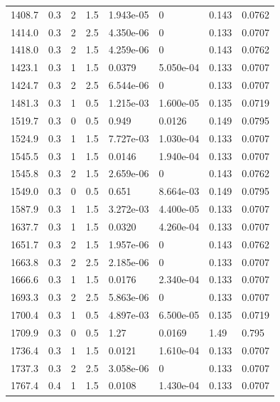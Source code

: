 \documentclass[preview]{standalone}
\begin{document}
{{{\begin{tabular}{L{1.2cm}C{1.2cm} C{0.3cm}C{0.5cm} C{1.4cm}C{1.4cm} C{1.4cm}C{1.4cm}}
  1408.7  &   0.3  & 2     & 1.5 &  1.943e-05  & 0  & 0.143 &  0.0762   \\ 
  1414.0  &   0.3  & 2     & 2.5 &  4.350e-06  & 0  & 0.133 &  0.0707   \\ 
  1418.0  &   0.3  & 2     & 1.5 &  4.259e-06  & 0  & 0.143 &  0.0762   \\ 
  1423.1  &   0.3  & 1     & 1.5 &  0.0379  & 5.050e-04  & 0.133 &  0.0707   \\ 
  1424.7  &   0.3  & 2     & 2.5 &  6.544e-06  & 0  & 0.133 &  0.0707   \\ 
  1481.3  &   0.3  & 1     & 0.5 &  1.215e-03  & 1.600e-05  & 0.135 &  0.0719   \\ 
  1519.7  &   0.3  & 0     & 0.5 &  0.949  & 0.0126  & 0.149 &  0.0795   \\ 
  1524.9  &   0.3  & 1     & 1.5 &  7.727e-03  & 1.030e-04  & 0.133 &  0.0707   \\ 
  1545.5  &   0.3  & 1     & 1.5 &  0.0146  & 1.940e-04  & 0.133 &  0.0707   \\ 
  1545.8  &   0.3  & 2     & 1.5 &  2.659e-06  & 0  & 0.143 &  0.0762   \\ 
  1549.0  &   0.3  & 0     & 0.5 &  0.651  & 8.664e-03  & 0.149 &  0.0795   \\ 
  1587.9  &   0.3  & 1     & 1.5 &  3.272e-03  & 4.400e-05  & 0.133 &  0.0707   \\ 
  1637.7  &   0.3  & 1     & 1.5 &  0.0320  & 4.260e-04  & 0.133 &  0.0707   \\ 
  1651.7  &   0.3  & 2     & 1.5 &  1.957e-06  & 0  & 0.143 &  0.0762   \\ 
  1663.8  &   0.3  & 2     & 2.5 &  2.185e-06  & 0  & 0.133 &  0.0707   \\ 
  1666.6  &   0.3  & 1     & 1.5 &  0.0176  & 2.340e-04  & 0.133 &  0.0707   \\ 
  1693.3  &   0.3  & 2     & 2.5 &  5.863e-06  & 0  & 0.133 &  0.0707   \\ 
  1700.4  &   0.3  & 1     & 0.5 &  4.897e-03  & 6.500e-05  & 0.135 &  0.0719   \\ 
  1709.9  &   0.3  & 0     & 0.5 &  1.27  & 0.0169  & 1.49 &  0.795   \\ 
  1736.4  &   0.3  & 1     & 1.5 &  0.0121  & 1.610e-04  & 0.133 &  0.0707   \\ 
  1737.3  &   0.3  & 2     & 2.5 &  3.058e-06  & 0  & 0.133 &  0.0707   \\ 
  1767.4  &   0.4  & 1     & 1.5 &  0.0108  & 1.430e-04  & 0.133 &  0.0707   \\ 

\end{tabular}}}}
\end{document}
